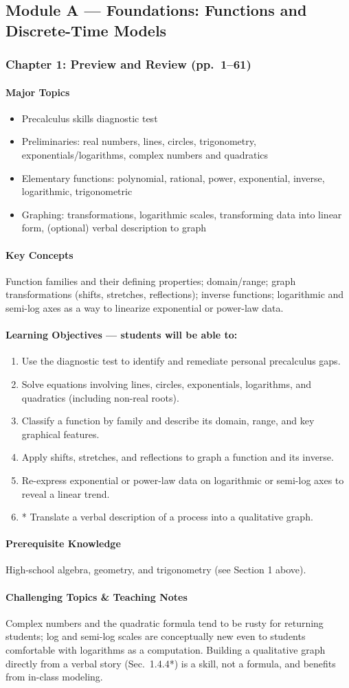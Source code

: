 \documentclass[11pt]{article}
\newcommand{\ChapHead}[2]{\subsubsection{#1 \textnormal{\normalfont\normalsize\color{lightgray}(pp.\ #2)}}}
\newcommand{\MajorTopics}{\paragraph{Major Topics}}
\newcommand{\KeyConcepts}{\paragraph{Key Concepts}}
\newcommand{\LearnObj}{\paragraph{Learning Objectives --- students will be able to:}}
\newcommand{\PreReq}{\paragraph{Prerequisite Knowledge}}
\newcommand{\Hard}{\paragraph{Challenging Topics \& Teaching Notes}}
\begin{document}
\subsection{Module A --- Foundations: Functions and Discrete-Time Models}

\ChapHead{Chapter 1: Preview and Review}{1--61}

\MajorTopics
\begin{itemize}
\item Precalculus skills diagnostic test
\item Preliminaries: real numbers, lines, circles, trigonometry, exponentials/logarithms, complex numbers and quadratics
\item Elementary functions: polynomial, rational, power, exponential, inverse, logarithmic, trigonometric
\item Graphing: transformations, logarithmic scales, transforming data into linear form, (optional) verbal description to graph
\end{itemize}

\KeyConcepts
Function families and their defining properties; domain/range; graph
transformations (shifts, stretches, reflections); inverse functions;
logarithmic and semi-log axes as a way to linearize exponential or
power-law data.

\LearnObj
\begin{enumerate}
\item Use the diagnostic test to identify and remediate personal precalculus gaps.
\item Solve equations involving lines, circles, exponentials, logarithms, and quadratics (including non-real roots).
\item Classify a function by family and describe its domain, range, and key graphical features.
\item Apply shifts, stretches, and reflections to graph a function and its inverse.
\item Re-express exponential or power-law data on logarithmic or semi-log axes to reveal a linear trend.
\item * Translate a verbal description of a process into a qualitative graph.
\end{enumerate}

\PreReq High-school algebra, geometry, and trigonometry (see Section 1 above).

\Hard Complex numbers and the quadratic formula tend to be rusty for
returning students; log and semi-log scales are conceptually new even to
students comfortable with logarithms as a computation. Building a
qualitative graph directly from a verbal story (Sec.\ 1.4.4*) is a skill,
not a formula, and benefits from in-class modeling.
\end{document}
